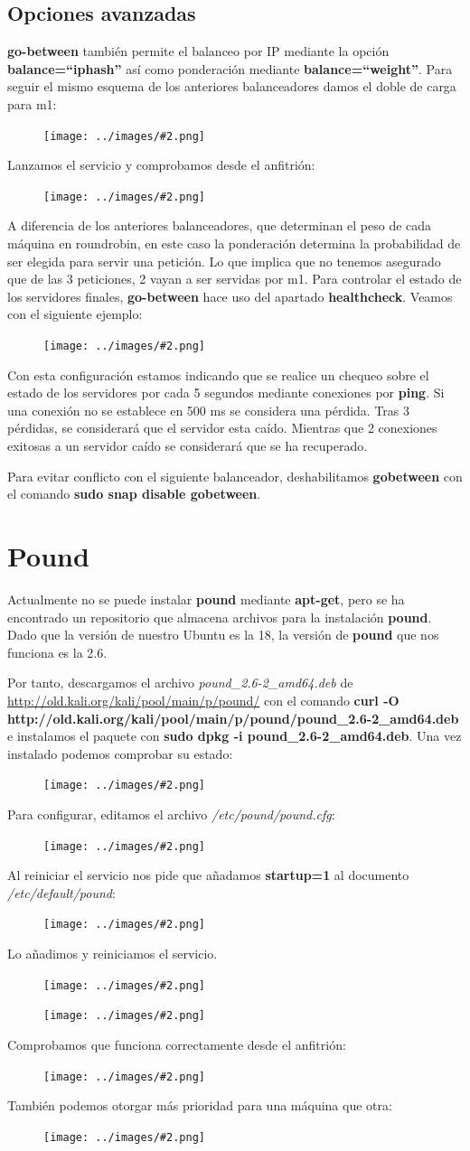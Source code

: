 \documentclass[twoside]{article}
\newcommand{\enquote}[1]{``#1''}
\newcommand{\image}[2]{
\begin{figure}[H]
    \texttt{[image: ../images/\#2.png]}
    \centering
\end{figure}
}
\begin{document}
\subsection{Opciones avanzadas}
\textbf{go-between} también permite el balanceo por IP mediante la opción \textbf{balance=\enquote{iphash}} así como ponderación mediante \textbf{balance=\enquote{weight}}. Para seguir el mismo esquema de los anteriores balanceadores damos el doble de carga para m1:
\image{6}{35}
Lanzamos el servicio y comprobamos desde el anfitrión:
\image{8}{36}
A diferencia de los anteriores balanceadores, que determinan el peso de cada máquina en roundrobin, en este caso la ponderación determina la probabilidad de ser elegida para servir una petición. Lo que implica que no tenemos asegurado que de las 3 peticiones, 2 vayan a ser servidas por m1.
Para controlar el estado de los servidores finales, \textbf{go-between} hace uso del apartado \textbf{healthcheck}. Veamos con el siguiente ejemplo:
\image{6}{37}
Con esta configuración estamos indicando que se realice un chequeo sobre el estado de los servidores por cada 5 segundos mediante conexiones por \textbf{ping}. Si una conexión no se establece en 500 ms se considera una pérdida. Tras 3 pérdidas, se considerará que el servidor esta caído. Mientras que 2 conexiones exitosas a un servidor caído se considerará que se ha recuperado.  

Para evitar conflicto con el siguiente balanceador, deshabilitamos \textbf{gobetween} con el comando \textbf{sudo snap disable gobetween}.

\section{Pound}
Actualmente no se puede instalar \textbf{pound} mediante \textbf{apt-get}, pero se ha encontrado un repositorio que almacena archivos para la instalación \textbf{pound}. Dado que la versión de nuestro Ubuntu es la 18, la versión de \textbf{pound} que nos funciona es la 2.6.

Por tanto, descargamos el archivo \textit{pound\_2.6-2\_amd64.deb} de \url{http://old.kali.org/kali/pool/main/p/pound/} con el comando \textbf{curl -O http://old.kali.org/kali/pool/main/p/pound/pound\_2.6-2\_amd64.deb} e instalamos el paquete con \textbf{sudo dpkg -i pound\_2.6-2\_amd64.deb}. Una vez instalado podemos comprobar su estado:
\image{8}{38}
Para configurar, editamos el archivo \textit{/etc/pound/pound.cfg}:
\image{8}{39}
Al reiniciar el servicio nos pide que añadamos \textbf{startup=1} al documento \textit{/etc/default/pound}:
\image{8}{40}
Lo añadimos y reiniciamos el servicio.
\image{8}{41}
\image{8}{42}
Comprobamos que funciona correctamente desde el anfitrión:
\image{8}{43}
También podemos otorgar más prioridad para una máquina que otra:
\image{8}{44}
\end{document}
